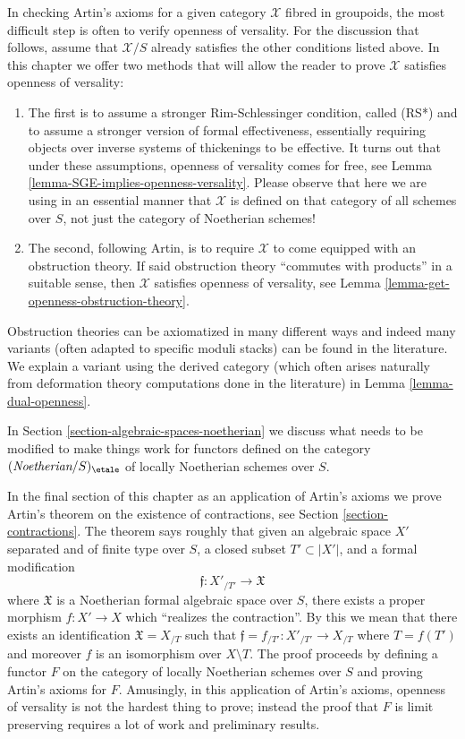 \medskip\noindent
In checking Artin's axioms for a given category $\mathcal{X}$ fibred
in groupoids, the most difficult step is often to verify openness
of versality. For the discussion that follows, assume that $\mathcal{X}/S$
already satisfies the other conditions listed above.
In this chapter we offer two methods that will allow the reader
to prove $\mathcal{X}$ satisfies openness of versality:
\begin{enumerate}
\item The first is to assume a stronger Rim-Schlessinger
condition, called (RS*) and to assume a stronger version of
formal effectiveness, essentially requiring objects over
inverse systems of thickenings to be effective. It turns out
that under these assumptions, openness of versality comes for
free, see Lemma \ref{lemma-SGE-implies-openness-versality}.
Please observe that here we are using in an essential manner
that $\mathcal{X}$ is defined on that category of all schemes
over $S$, not just the category of Noetherian schemes!
\item The second, following Artin, is to require $\mathcal{X}$
to come equipped with an obstruction theory. If said obstruction
theory ``commutes with products'' in a suitable sense, then
$\mathcal{X}$ satisfies openness of versality, see
Lemma \ref{lemma-get-openness-obstruction-theory}.
\end{enumerate}
Obstruction theories can be axiomatized in many different ways
and indeed many variants (often adapted to specific moduli stacks)
can be found in the literature. We explain a variant using the derived category
(which often arises naturally from deformation theory computations
done in the literature) in Lemma \ref{lemma-dual-openness}.

\medskip\noindent
In Section \ref{section-algebraic-spaces-noetherian}
we discuss what needs to be modified to make
things work for functors defined on the category
$(\textit{Noetherian}/S)_\etale$ of locally Noetherian
schemes over $S$.

\medskip\noindent
In the final section of this chapter as an application of Artin's axioms
we prove Artin's theorem on the existence of contractions, see
Section \ref{section-contractions}. The theorem says roughly that given an
algebraic space $X'$ separated and of finite type over $S$,
a closed subset $T' \subset |X'|$, and a formal modification
$$
\mathfrak{f} : X'_{/T'} \longrightarrow \mathfrak{X}
$$
where $\mathfrak{X}$ is a Noetherian formal algebraic space over $S$,
there exists a proper morphism $f : X' \to X$ which
``realizes the contraction''. By this we mean that there exists an
identification $\mathfrak{X} = X_{/T}$ such that
$\mathfrak{f} = f_{/T'} : X'_{/T'} \to X_{/T}$ where $T = f(T')$
and moreover $f$ is an isomorphism over $X \setminus T$. The proof proceeds
by defining a functor $F$ on the category of locally Noetherian schemes
over $S$ and proving Artin's axioms for $F$. Amusingly, in this
application of Artin's axioms, openness of versality is not the hardest
thing to prove; instead the proof that $F$ is limit preserving requires
a lot of work and preliminary results.




